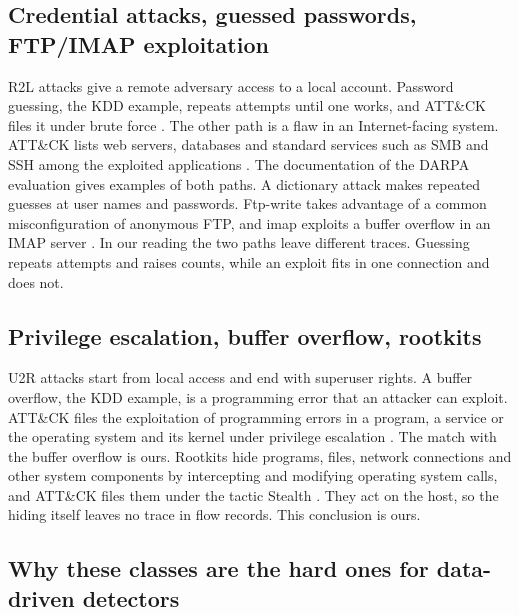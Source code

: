 \subsection{Credential attacks, guessed passwords, FTP/\allowbreak IMAP exploitation}
\label{sec:credential-attacks}

R2L attacks give a remote adversary access to a local account. Password
guessing, the KDD example, repeats attempts until one works, and ATT\&CK
files it under brute force \citep{mitre2026t1110}. The other path is a flaw in
an Internet-facing system. ATT\&CK lists web servers, databases and standard
services such as SMB and SSH among the exploited applications
\citep{mitre2026t1190}. The documentation of the DARPA evaluation gives
examples of both paths. A dictionary attack makes repeated guesses at user
names and passwords. Ftp-write takes advantage of a common misconfiguration
of anonymous FTP, and imap exploits a buffer overflow in an IMAP server
\citep{mitll1998attacks}. In our reading the two paths leave different traces.
Guessing repeats attempts and raises counts, while an exploit fits in one
connection and does not.

\subsection{Privilege escalation, buffer overflow, rootkits}
\label{sec:privilege-escalation}

U2R attacks start from local access and end with superuser rights. A buffer
overflow, the KDD example, is a programming error that an attacker can
exploit. ATT\&CK files the exploitation of programming errors in a program, a
service or the operating system and its kernel under privilege escalation
\citep{mitre2025t1068}. The match with the buffer overflow is ours. Rootkits
hide programs, files, network connections and other system components by
intercepting and modifying operating system calls, and ATT\&CK files them
under the tactic Stealth \citep{mitre2026t1014}. They act on the host, so the
hiding itself leaves no trace in flow records. This conclusion is ours.

\subsection{Why these classes are the hard ones for data-driven detectors}
\label{sec:r2l-u2r-hard}


